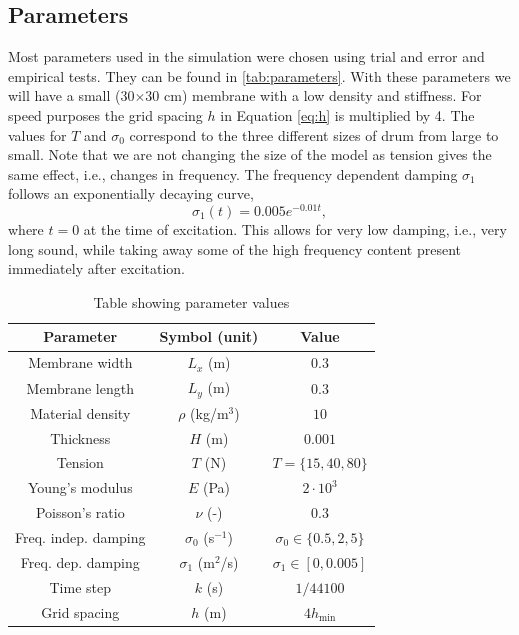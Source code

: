\documentclass{vgtc}
\begin{document}
\subsection{Parameters}
Most parameters used in the simulation were chosen using trial and error and empirical tests. They can be found in \autoref{tab:parameters}. With these parameters we will have a small (30$\times$30 cm) membrane with a low density and stiffness. For speed purposes the grid spacing $h$ in Equation \eqref{eq:h} is multiplied by 4. The values for $T$ and $\sigma_0$ correspond to the three different sizes of drum from large to small. Note that we are not changing the size of the model as tension gives the same effect, i.e., changes in frequency. The frequency dependent damping  $\sigma_1$ follows an exponentially decaying curve, 
\begin{equation}
    \sigma_1(t) = 0.005e^{-0.01 t},
\end{equation}
where $t=0$ at the time of excitation. This allows for very low damping, i.e., very long sound, while taking away some of the high frequency content present immediately after excitation.
\begin{table}[h]
\caption{Table showing parameter values}\label{tab:parameters}
\centering
\begin{tabular}{|c|c|c|}
    \hline
    Parameter & Symbol (unit) & Value \\
    \hline
    Membrane width & $L_x$ (m) & $0.3$\\
    Membrane length & $L_y$ (m) & $0.3$ \\
    Material density & $\rho$ (kg/m$^3$)& $10$ \\
    Thickness & $H$ (m) & $0.001$ \\
    Tension & $T$ (N) & $T = \{15, 40, 80\}$ \\
    Young's modulus & $E$ (Pa)& $2\cdot 10^3$ \\
    Poisson's ratio & $\nu$ (-)& $0.3$ \\
    Freq. indep. damping & $\sigma_0$ (s$^{-1}$) & $\sigma_0 \in \{0.5, 2, 5\}$\\
    Freq. dep. damping & $\sigma_1$ (m$^2$/s) & $\sigma_1 \in [0, 0.005]$\\
    Time step & $k$ (s) & $1/44100$\\
    Grid spacing & $h$ (m) & $4h_\text{min}$\\
    \hline
\end{tabular}
\end{table}
\end{document}
